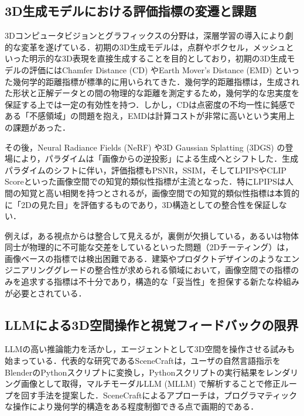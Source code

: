 \documentclass[dvipdfmx, a4paper, 9pt]{deimj}
\begin{document}
\subsection{3D生成モデルにおける評価指標の変遷と課題}

3Dコンピュータビジョンとグラフィックスの分野は，深層学習の導入により劇的な変革を遂げている．初期の3D生成モデルは，点群やボクセル，メッシュといった明示的な3D表現を直接生成することを目的としており，初期の3D生成モデルの評価にはChamfer Distance (CD) やEarth Mover's Distance (EMD) といった幾何学的距離指標が標準的に用いられてきた\cite{fan2017point,nichol2022point}．幾何学的距離指標は，生成された形状と正解データとの間の物理的な距離を測定するため，幾何学的な忠実度を保証する上では一定の有効性を持つ．しかし，CDは点密度の不均一性に鈍感である「不感領域」の問題を抱え，EMDは計算コストが非常に高いという実用上の課題があった．

その後，Neural Radiance Fields (NeRF)\cite{mildenhall2020nerf} や3D Gaussian Splatting (3DGS)\cite{kerbl20233dgs} の登場により，パラダイムは「画像からの逆投影」による生成へとシフトした．生成パラダイムのシフトに伴い，評価指標もPSNR，SSIM，そしてLPIPS\cite{zhang2018lpips}やCLIP Score\cite{radford2021clip}といった画像空間での知覚的類似性指標が主流となった．特にLPIPSは人間の知覚と高い相関を持つとされるが，画像空間での知覚的類似性指標は本質的に「2Dの見た目」を評価するものであり，3D構造としての整合性を保証しない．

例えば，ある視点からは整合して見えるが，裏側が欠損している，あるいは物体同士が物理的に不可能な交差をしているといった問題（2Dチーティング）は，画像ベースの指標では検出困難である\cite{poole2022dreamfusion}．建築やプロダクトデザインのようなエンジニアリンググレードの整合性が求められる領域において，画像空間での指標のみを追求する指標は不十分であり，構造的な「妥当性」を担保する新たな枠組みが必要とされている．

\subsection{LLMによる3D空間操作と視覚フィードバックの限界}

LLMの高い推論能力を活かし，エージェントとして3D空間を操作させる試みも始まっている．代表的な研究であるSceneCraft\cite{hu2024scenecraft}は，ユーザの自然言語指示をBlenderのPythonスクリプトに変換し，Pythonスクリプトの実行結果をレンダリング画像として取得，マルチモーダルLLM (MLLM) で解析することで修正ループを回す手法を提案した．SceneCraftによるアプローチは，プログラマティックな操作により幾何学的構造をある程度制御できる点で画期的である．
\end{document}
